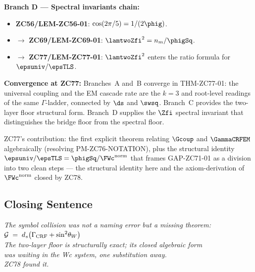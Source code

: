 \documentclass[12pt, a4paper]{article}
\begin{document}
\begin{genealogybox}[title={How ZC77's Key Objects Trace Back}]
\textbf{Branch D --- Spectral invariants chain:}
\begin{itemize}[leftmargin=2em, noitemsep]
  \item \textbf{ZC56/LEM-ZC56-01}: $\cos(2\pi/5) = 1/(2\phig)$.
  \item $\to$ \textbf{ZC69/LEM-ZC69-01}: $\lamtwoZfi^2 = n_m/\phigSq$.
  \item $\to$ \textbf{ZC77/LEM-ZC77-01}: $\lamtwoZfi^2$ enters the
    ratio formula for $\epsuniv/\epsTLS$.
\end{itemize}

\textbf{Convergence at ZC77:}
Branches~A and~B converge in THM-ZC77-01: the universal coupling and
the EM cascade rate are the $k=3$ and root-level readings of the same
$\Gamma$-ladder, connected by $\ds$ and $\swsq$. Branch~C provides the
two-layer floor structural form. Branch~D supplies the $\Zfi$ spectral
invariant that distinguishes the bridge floor from the spectral floor.

ZC77's contribution: the first explicit theorem relating $\Gcoup$ and
$\GammaCRFEM$ algebraically (resolving PM-ZC76-NOTATION), plus the
structural identity $\epsuniv/\epsTLS = \phigSq/\FWc^{\rm norm}$
that frames GAP-ZC71-01 as a division into two clean steps --- the
structural identity here and the axiom-derivation of $\FWc^{\rm norm}$
closed by ZC78.
\end{genealogybox}

\subsection{Closing Sentence}

\bigskip
\begin{center}
\textit{%
  The symbol collision was not a naming error but a missing theorem:\\[0.3em]
  $\displaystyle\mathcal{G} \;=\; d_s\bigl(\Gamma_{\rm CRF} + \sin^2\!\theta_W\bigr)$\\[0.4em]
  The two-layer floor is structurally exact; its closed algebraic form\\
  was waiting in the Wc system, one substitution away.\\[0.3em]
  ZC78 found it.
}
\end{center}
\end{document}
